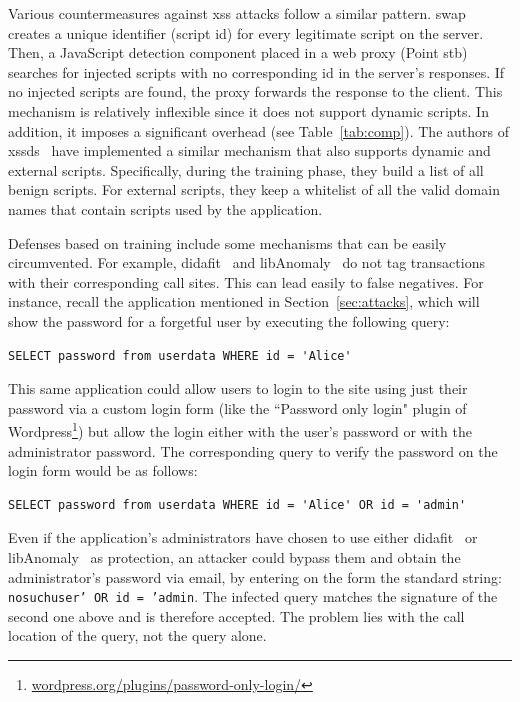 \documentclass[10pt,journal,compsoc]{IEEEtran}
\begin{document}
Various countermeasures against {\sc xss} attacks follow a similar
pattern. {\sc swap}~\cite{WPLKK09} creates a unique identifier
(script {\sc id}) for every legitimate script on the server.
Then, a JavaScript detection component placed in a web proxy (Point
{\sc s}t{\sc b}) searches for injected scripts with no corresponding {\sc id}
in the server's responses. If no injected scripts are found, the proxy
forwards the response to the client. This mechanism is relatively
inflexible since it does not support dynamic scripts. In addition, it
imposes a significant overhead (see Table~\ref{tab:comp}). The authors
of {\sc xssds}~\cite{JEP08} have implemented a similar mechanism
that also supports dynamic and external scripts. Specifically, during the
training phase, they build a list of all benign scripts. For
external scripts, they keep a whitelist of all the valid domain names
that contain scripts used by the application.

Defenses based on training include some mechanisms that can be easily
circumvented. For example, {\sc didafit}~\cite{LLW02}
and libAnomaly~\cite{VMV05} do not tag transactions with their
corresponding call sites. This can lead
easily to false negatives. For instance, recall the application
mentioned in Section~\ref{sec:attacks}, which will show the password
for a forgetful user by executing the following query:

\lstset{language=SQL}
\begin{lstlisting}
SELECT password from userdata WHERE id = 'Alice'
\end{lstlisting}
\vspace{-1mm}
\noindent
This same application could allow users to
login to the site using just their password via a custom login form
(like the ``Password only login" plugin of
Wordpress\footnote{\scriptsize\url{wordpress.org/plugins/password-only-login/}})
but allow the login either with the user's password or with
the administrator password. The corresponding query to verify
the password on the login form would be as follows:

\lstset{language=SQL}
\begin{lstlisting}
SELECT password from userdata WHERE id = 'Alice' OR id = 'admin'
\end{lstlisting}
\vspace{-1mm}
\noindent
Even if the application's administrators have chosen to use
either {\sc didafit}~\cite{LLW02} or
libAnomaly~\cite{VMV05} as protection,
an attacker could bypass them and obtain the
administrator's password via email,
by entering on the form the standard string:
{\tt nosuchuser' OR id = 'admin}. The infected query matches the
signature of the second one above and is therefore accepted.
The problem lies with the call location of the query, not the query alone.
\end{document}
